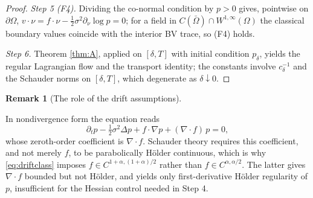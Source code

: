 \documentclass[11pt]{amsart}
\theoremstyle{definition}
\newtheorem{remark}[theorem]{Remark}
\newcommand{\dive}{\nabla\!\cdot}
\begin{document}
\begin{proof}
\emph{Step 5 (F4).} Dividing the co-normal condition by $p>0$
gives, pointwise on $\partial\Omega$,
$v\cdot\nu=f\cdot\nu-\tfrac12\sigma^2\partial_\nu\log p=0$; for a
field in $C(\bar\Omega)\cap W^{1,\infty}(\Omega)$ the classical
boundary values coincide with the interior BV trace, so (F4) holds.

\emph{Step 6.} Theorem \ref{thm:A}, applied on $[\delta,T]$ with
initial condition $p_\delta$, yields the regular Lagrangian flow and
the transport identity; the constants involve $c_\delta^{-1}$ and
the Schauder norms on $[\delta,T]$, which degenerate as
$\delta\downarrow0$.
\end{proof}

\begin{remark}[The role of the drift assumptions]\label{rem:driftrole}

In nondivergence form
the equation reads
\[
\partial_tp-\tfrac12\sigma^2\Delta p+f\cdot\nabla p+(\dive f)\,p=0,
\]
whose zeroth-order coefficient is $\dive f$. Schauder theory
requires this coefficient, and not merely $f$, to be parabolically
H\"older continuous, which is why \eqref{eq:driftclass} imposes
$f\in C^{1+\alpha,(1+\alpha)/2}$ rather than $f\in
C^{\alpha,\alpha/2}$. The latter
gives $\dive f$ bounded but not H\"older, and yields only
first-derivative H\"older regularity of $p$, insufficient for the
Hessian control needed in Step 4.


\end{remark}
\end{document}
